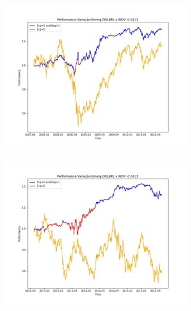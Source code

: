 \begin{figure}[H]
    \centering
    \begin{subfigure}{0.45\linewidth}
        \includegraphics[width = \textwidth]{relatorios/consult/imagens/Imagem6.jpg}
    \end{subfigure}
    \hfill
    \begin{subfigure}{0.45\linewidth}
        \includegraphics[width = \textwidth]{relatorios/consult/imagens/Imagem7.jpg}
    \end{subfigure}
    \begin{subfigure}{0.45\linewidth}

\end{subfigure}
\end{figure}
